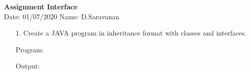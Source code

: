\documentclass[a4paper,11pt,openright]{report}
\begin{document}
\singlespacing
\pagestyle{plain}

\begin{center}
\textbf{Assignment Interface} \\
Date: 01/07/2020 \hspace{2mm} Name: D.Saravanan
\end{center}

\vspace{10px}

\begin{enumerate}

\item[1.] Create a JAVA program in inheritance format with classes and interfaces.

\vspace{0.5cm}

Program: 


\vspace{0.5cm}

Output:


\end{enumerate}
\end{document}
